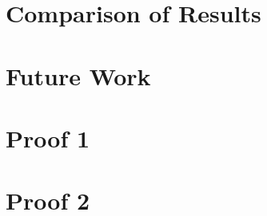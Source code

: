 \documentclass[12pt, twoside, openright]{report}
\begin{document}
\chapter{Comparison of Results}

\Blindtext

\chapter{Future Work}

\Blindtext

\appendix

\chapter{Proof 1}

\blindmathtrue
\Blindtext

\chapter{Proof 2}

\blindtext
\end{document}
